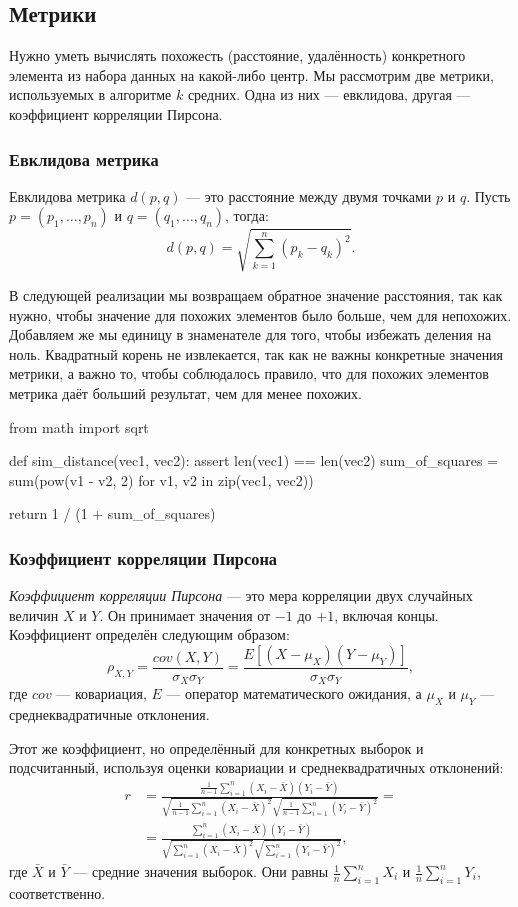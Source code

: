 \subsection{Метрики}
Нужно уметь вычислять похожесть (расстояние, удалённость) конкретного элемента из набора данных на какой-либо центр. Мы рассмотрим две метрики, используемых в алгоритме $k$ средних. Одна из них — евклидова, другая — коэффициент корреляции Пирсона.

\subsubsection{Евклидова метрика}
Евклидова метрика $d(p, q)$ — это расстояние между двумя точками $p$ и $q$. Пусть $p = (p_1, \dots, p_n)$ и $q = (q_1, \dots, q_n)$, тогда:
\[
d(p, q) = \sqrt{\sum_{k = 1}^n (p_k - q_k)^2}.
\]

В следующей реализации мы возвращаем обратное значение расстояния, так как нужно, чтобы значение для похожих элементов было больше, чем для непохожих. Добавляем же мы единицу в знаменателе для того, чтобы избежать деления на ноль. Квадратный корень не извлекается, так как не важны конкретные значения метрики, а важно то, чтобы соблюдалось правило, что для похожих элементов метрика даёт больший результат, чем для менее похожих.
\begin{pylst}{}{}
from math import sqrt

def sim_distance(vec1, vec2):
    assert len(vec1) == len(vec2)
    sum_of_squares = sum(pow(v1 - v2, 2)
                         for v1, v2 in zip(vec1, vec2))

    return 1 / (1 + sum_of_squares)
\end{pylst}

\subsubsection{Коэффициент корреляции Пирсона}
\emph{Коэффициент корреляции Пирсона} — это мера корреляции двух случайных величин \(X\) и \(Y\). Он принимает значения от \(-1\) до \(+1\), включая концы. Коэффициент определён следующим образом:
\[
\rho_{X, Y} = \frac{cov(X, Y)}{\sigma_X \sigma_Y} = \frac{E[(X - \mu_X)(Y - \mu_Y)]}{\sigma_X \sigma_Y},
\]
где \(cov\) — ковариация, \(E\) — оператор математического ожидания, а \(\mu_X\) и \(\mu_Y\) — среднеквадратичные отклонения.

Этот же коэффициент, но определённый для конкретных выборок и подсчитанный, используя оценки ковариации и среднеквадратичных отклонений:
\begin{align*}
r &= \frac{\frac{1}{n - 1} \sum_{i = 1}^n (X_i - \bar{X})(Y_i - \bar{Y})}{\sqrt{\frac{1}{n - 1} \sum_{i = 1}^n (X_i - \bar{X})^2} \sqrt{\frac{1}{n - 1} \sum_{i = 1}^n (Y_i - \bar{Y})^2}} = \\
  &= \frac{\sum_{i = 1}^n (X_i - \bar{X})(Y_i - \bar{Y})}{\sqrt{\sum_{i = 1}^n (X_i - \bar{X})^2} \sqrt{\sum_{i = 1}^n (Y_i - \bar{Y})^2}},
\end{align*}
где \(\bar{X}\) и \(\bar{Y}\) — средние значения выборок. Они равны \(\frac{1}{n} \sum_{i = 1}^n X_i\) и \(\frac{1}{n} \sum_{i = 1}^n Y_i\), соответственно.

